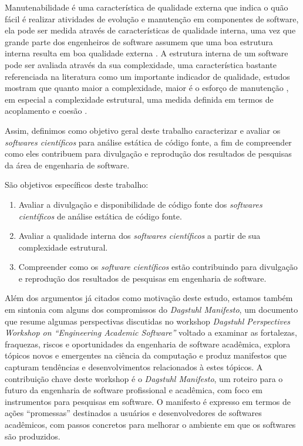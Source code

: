 Manutenabilidade é uma característica de qualidade externa que indica o quão
fácil é realizar atividades de evolução e manutenção em componentes de
software, ela pode ser medida através de características de qualidade interna,
uma vez que grande parte dos engenheiros de software assumem que uma boa
estrutura interna resulta em boa qualidade externa \cite{Fenton2014}. A
estrutura interna de um software pode ser avaliada através da sua complexidade,
uma característica bastante referenciada na literatura como um importante
indicador de qualidade, estudos mostram que quanto maior a complexidade, maior
é o esforço de manutenção \cite{hashim1996software, Darcy2005}, em especial a
complexidade estrutural, uma medida definida em termos de acoplamento e coesão
\cite{Terceiro2012}.

Assim, definimos como objetivo geral deste trabalho caracterizar e avaliar os
{\it softwares científicos} para análise estática de código fonte, a fim de
compreender como eles contribuem para divulgação e reprodução dos resultados de
pesquisas da área de engenharia de software.

São objetivos específicos deste trabalho:

\begin{enumerate}
  \item Avaliar a divulgação e disponibilidade de código fonte dos {\it softwares científicos} de análise estática de código fonte.
  \item Avaliar a qualidade interna dos {\it softwares científicos} a partir de sua complexidade estrutural.
  \item Compreender como os {\it software científicos} estão contribuindo para divulgação e reprodução dos resultados de pesquisas em engenharia de software.
\end{enumerate}


Além dos argumentos já citados como motivação deste estudo, estamos também em
sintonia com alguns dos compromissos do {\it Dagstuhl Manifesto}, um documento
que resume algumas perspectivas discutidas no workshop {\it Dagstuhl
Perspectives Workshop on ``Engineering Academic Software''} voltado a examinar
as fortalezas, fraquezas, riscos e oportunidades da engenharia de software
acadêmica, explora tópicos novos e emergentes na ciência da computação e produz
manifestos que capturam tendências e desenvolvimentos relacionados à estes
tópicos. A contribuição chave deste workshop é o {\it Dagstuhl Manifesto}, um
roteiro para o futuro da engenharia de software profissional e acadêmica, com
foco em instrumentos para pesquisas em software.  O manifesto é expresso em
termos de ações ``promessas'' destinados a usuários e desenvolvedores de
softwares acadêmicos, com passos concretos para melhorar o ambiente em que os
softwares são produzidos.

